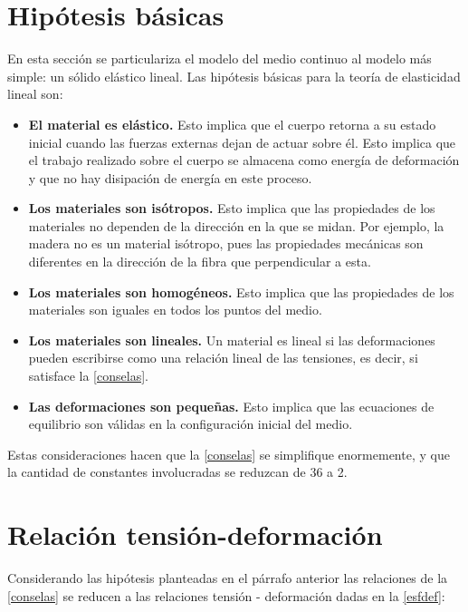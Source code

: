 \documentclass[../notas medios.tex]{subfiles}
\begin{document}
\section{Hipótesis básicas}
En esta sección se particulariza el modelo del medio continuo al modelo más simple: un sólido elástico lineal. Las hipótesis básicas para la teoría de elasticidad lineal son:
\begin{itemize}
\item \textbf{El material es elástico.} Esto implica que el cuerpo retorna a su estado inicial cuando las fuerzas externas dejan de actuar sobre él. Esto implica que el trabajo realizado sobre el cuerpo se almacena como energía de deformación y que no hay disipación de energía en este proceso.

\item \textbf{Los materiales son isótropos.} Esto implica que las propiedades de los materiales no dependen de la dirección en la que se midan. Por ejemplo, la madera no es un material isótropo, pues las propiedades mecánicas son diferentes en la dirección de la fibra que perpendicular a esta.

\item \textbf{Los materiales son homogéneos.} Esto implica que las propiedades de los materiales son iguales en todos los puntos del medio.

\item \textbf{Los materiales son lineales.} Un material es lineal si las deformaciones pueden escribirse como una relación lineal de las tensiones, es decir, si satisface la \cref{conselas}.

\item \textbf{Las deformaciones son pequeñas.} Esto implica que las ecuaciones de equilibrio son válidas en la configuración inicial del medio.

\end{itemize}

Estas consideraciones hacen que la \cref{conselas} se simplifique enormemente, y que la cantidad de constantes involucradas se reduzcan de 36 a 2.

\section{Relación tensión-deformación}
Considerando las hipótesis planteadas en el párrafo anterior las relaciones de la  \cref{conselas} se reducen a las relaciones tensión - deformación dadas en la  \cref{esfdef}:
\end{document}
